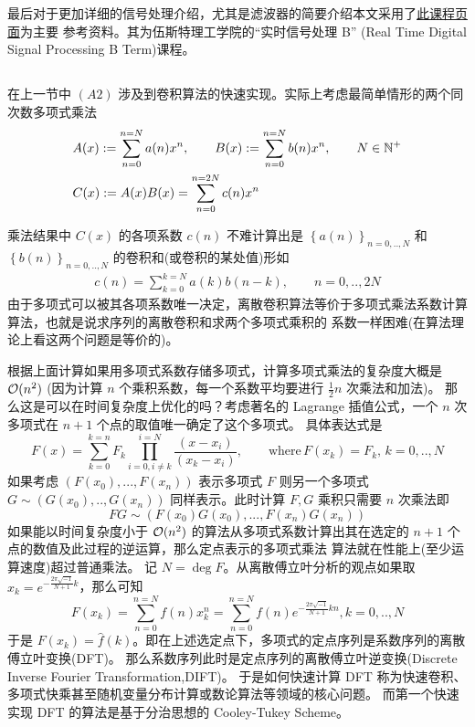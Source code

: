 最后对于更加详细的信号处理介绍，尤其是滤波器的简要介绍本文采用了\href{https://schaumont.dyn.wpi.edu/ece4703b20draft/index.html#}{此课程页面}为主要
参考资料。其为伍斯特理工学院的``实时信号处理 B'' (Real Time Digital
Signal Processing B Term)课程。

\subsection{}

在上一节中 $(A2)$ 涉及到卷积算法的快速实现。实际上考虑最简单情形的两个同次数多项式乘法
\begin{align*}
    &A(x) := \sum_{n=0}^{n=N}a(n)x^n,\qquad B(x) := \sum_{n=0}^{n=N}b(n) x^n,\qquad N \in \mathbb{N}^+\\
    &C(x) := A(x)B(x) = \sum_{n=0}^{n=2N} c(n)x^n
\end{align*}

乘法结果中 $C(x)$ 的各项系数 $c(n)$ 不难计算出是 $\left\{a(n)\right\}_{n=0,..,N}$ 和 $\left\{b(n)\right\}_{n=0,..,N}$
的卷积和(或卷积的某处值)形如
\begin{eqnarray*}
    c(n) = \sum_{k=0}^{k=N}a(k)b(n-k),\qquad n=0,..,2N
\end{eqnarray*}
由于多项式可以被其各项系数唯一决定，离散卷积算法等价于多项式乘法系数计算算法，也就是说求序列的离散卷积和求两个多项式乘积的
系数一样困难(在算法理论上看这两个问题是等价的)。

根据上面计算如果用多项式系数存储多项式，计算多项式乘法的复杂度大概是 $\mathcal{O} (n^2)$ (因为计算 $n$ 个乘积系数，每一个系数平均要进行 $\frac{1}{2}n$ 次乘法和加法)。
那么这是可以在时间复杂度上优化的吗？考虑著名的 Lagrange 插值公式，一个 $n$ 次多项式在 $n+1$ 个点的取值唯一确定了这个多项式。
具体表达式是 
\begin{equation*}
    F(x) = \sum_{k=0}^{k=n} F_k \prod_{i=0,i\not=k}^{i=N}\frac{(x- x_i)}{(x_k - x_i)},\qquad \mathrm{where}\, F(x_k) = F_k,\, k=0,..,N
\end{equation*}
如果考虑 $\left(F(x_0),...,F(x_n)\right)$ 表示多项式 $F$ 则另一个多项式 $G \sim \left(G(x_0),..,G(x_n)\right)$
同样表示。此时计算 $F,G$ 乘积只需要 $n$ 次乘法即
\begin{equation*}
    FG \sim \left(F(x_0)G(x_0),...,F(x_n)G(x_n)\right)
\end{equation*}
如果能以时间复杂度小于 $\mathcal{O}(n^2)$ 的算法从多项式系数计算出其在选定的 $n+1$ 个点的数值及此过程的逆运算，那么定点表示的多项式乘法
算法就在性能上(至少运算速度)超过普通乘法。
记 $N = \deg F$。从离散傅立叶分析的观点如果取 $x_k = e^{-\frac{2\pi \sqrt{-1}}{N+1}k}$，那么可知
\begin{equation*}
    F(x_k) = \sum_{n=0}^{n=N} f(n)x_k^n = \sum_{n=0}^{n=N}f(n)e^{-\frac{2\pi\sqrt{-1}}{N+1} kn}, k=0,..,N
\end{equation*}
于是 $F(x_k) = \widehat{f}(k)$。即在上述选定点下，多项式的定点序列是系数序列的离散傅立叶变换(DFT)。
那么系数序列此时是定点序列的离散傅立叶逆变换(Discrete Inverse Fourier Transformation,DIFT)。
于是如何快速计算 DFT 称为快速卷积、多项式快乘甚至随机变量分布计算或数论算法等领域的核心问题。
而第一个快速实现 DFT 的算法是基于分治思想的 Cooley-Tukey Scheme。

